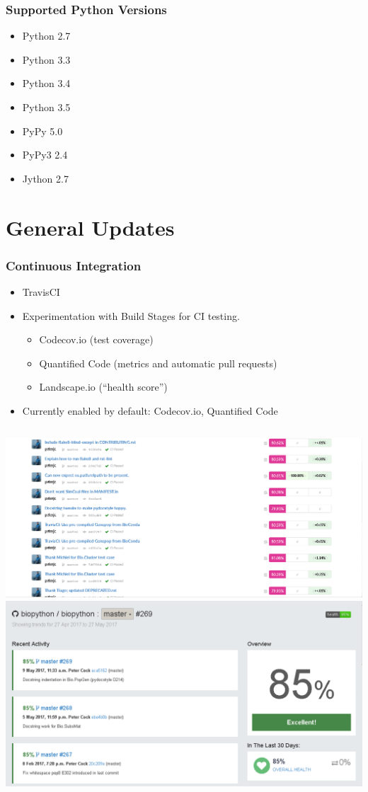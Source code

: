 \documentclass[trans]{beamer}
\begin{document}
\frame
{
  \frametitle{Supported Python Versions}
  
  \begin{itemize}
  \item Python 2.7
  \item Python 3.3
  \item Python 3.4
  \item Python 3.5
  \item PyPy 5.0
  \item PyPy3 2.4
  \item Jython 2.7
  \end{itemize}  
}

\section{General Updates}
\frame
{
  \frametitle{Continuous Integration}

  \begin{itemize}
  \item TravisCI
  \item Experimentation with Build Stages for CI testing.
  \begin{itemize}
  \item Codecov.io (test coverage)
  \item Quantified Code (metrics and automatic pull requests)
  \item Landscape.io (``health score'')
  \end{itemize}
  \item Currently enabled by default: Codecov.io, Quantified Code
  \end{itemize}

  \begin{columns}
  \includegraphics[width=1\textwidth]{bp-codecov.png}
  \includegraphics[width=1\textwidth]{bp-landscape.png}
  \end{columns}
}
\end{document}
